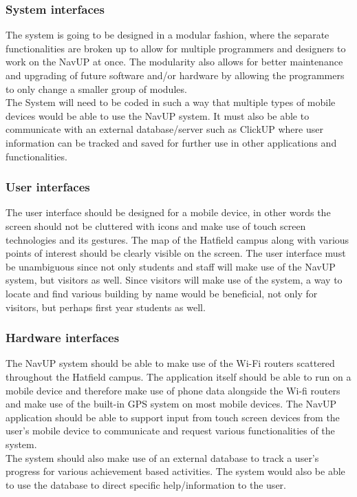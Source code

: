 \documentclass[a4paper,12pt]{article}
\begin{document}
\subsubsection{System interfaces}
The system is going to be designed in a modular fashion, where the separate functionalities are broken up to allow for multiple programmers and designers to work on the NavUP at once. The modularity also allows for better maintenance and upgrading of future software and/or hardware by allowing the programmers to only change a smaller group of modules.\\
The System will need to be coded in such a way that multiple types of mobile devices would be able to use the NavUP system. It must also be able to communicate with an external database/server such as ClickUP where user information can be tracked and saved for further use in other applications and functionalities.
\subsubsection{User interfaces}
The user interface should be designed for a mobile device, in other words the screen should not be cluttered with icons and make use of touch screen technologies and its gestures. The map of the Hatfield campus along with various points of interest should be clearly visible on the screen. The user interface must be unambiguous since not only students and staff will make use of the NavUP system, but visitors as well. Since visitors will make use of the system, a way to locate and find various building by name would be beneficial, not only for visitors, but perhaps first year students as well.
\subsubsection{Hardware interfaces}
The NavUP system should be able to make use of the Wi-Fi routers scattered throughout the Hatfield campus. The application itself should be able to run on a mobile device and therefore make use of phone data alongside the Wi-fi routers and make use of the built-in GPS system on most mobile devices. The NavUP application should be able to support input from touch screen devices from the user’s mobile device to communicate and request various functionalities of the system.\\
The system should also make use of an external database to track a user’s progress for various achievement based activities. The system would also be able to use the database to direct specific help/information to the user.
\end{document}
